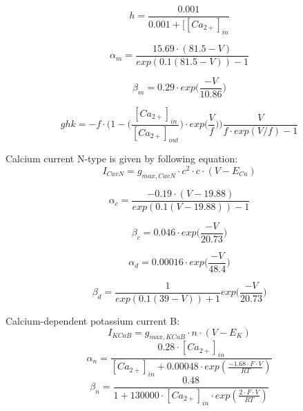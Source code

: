 \documentclass[12pt]{article}
\begin{document}
\begin{equation}
h = \frac{0.001}{0.001 +[[Ca_{2+}]_{in} }
\end{equation}

\begin{equation}
\alpha_{m} = \frac{15.69 \cdot (81.5-V)}{exp(0.1(81.5-V)) - 1}
\end{equation}

\begin{equation}
\beta_{m} = 0.29 \cdot exp \Big(\frac{-V}{10.86}\Big)
\end{equation}

\begin{equation}
ghk = -f \cdot \Big(1 - \Big(\frac{[Ca_{2+}]_{in}}{[Ca_{2+}]_{out}} \Big) \cdot exp \Big(\frac{V}{f}\Big) \Big) \frac{V}{f \cdot exp(V/f) -1 }
\end{equation}


Calcium current N-type is given by following equation: 
\begin{equation}
\label{eq:CavN}
I_{CavN} = g_{max, CavN} \cdot c^2 \cdot c \cdot (V - E_{Ca})
\end{equation}

\begin{equation}
\alpha_{c} = \frac{-0.19 \cdot (V - 19.88)}{exp(0.1(V - 19.88)) - 1}
\end{equation}

\begin{equation}
\beta_{c} = 0.046 \cdot exp \Big(\frac{-V}{20.73}\Big)
\end{equation}

\begin{equation}
\alpha_{d} = 0.00016 \cdot exp \Big(\frac{-V}{48.4}\Big)
\end{equation}

\begin{equation}
\beta_{d} = \frac{1}{exp(0.1(39 - V)) + 1} exp \Big(\frac{-V}{20.73}\Big)
\end{equation}


Calcium-dependent potassium current B:
\begin{equation}
I_{KCaB} = g_{max, KCaB} \cdot n \cdot (V - E_K)
\label{eq:KvCaB}
\end{equation}
\begin{equation}
\alpha_n = \frac{0.28 \cdot [Ca_{2+}]_{in} }{ [Ca_{2+}]_{in} + 0.00048 \cdot exp(\frac{-1.68 \cdot F \cdot V}{RT})  } 
\end{equation}
\begin{equation}
\beta_n = \frac{0.48}{1 + 130000 \cdot [Ca_{2+}]_{in} \cdot exp(\frac{2 \cdot F \cdot V}{RT})}
\end{equation}
\end{document}
